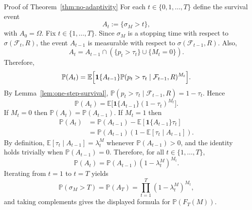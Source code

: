 \documentclass{uai2026} %
\newcommand{\1}{\mathbf{1}}
\newcommand{\ind}[1]{\mathbf{1}\{#1\}}
\newcommand{\prob}{\mathbb{P}}
\newcommand{\expec}{\mathbb{E}}
\newcommand{\F}{\mathcal{F}}
\begin{document}
\begin{appendixproof}{Proof of Theorem~\ref{thm:no-adaptivity}}
  For each $t\in\{0,1,\dots,T\}$ define the survival event
  \begin{equation*}
    A_{t}:=\{\sigma_{M}>t\},
  \end{equation*}
  with $A_{0}=\Omega$.
  Fix $t\in\{1,\dots,T\}$.
  Since $\sigma_{M}$ is a stopping time with respect to $\sigma(\F_{t},R)$, the event $A_{t-1}$ is measurable with respect to $\sigma(\F_{t-1},R)$.
  Also,
  \begin{equation*}
    A_{t}
    =
    A_{t-1}\cap\left(\{p_{t}>\tau_{t}\}\cup\{M_{t}=0\}\right).
  \end{equation*}
  Therefore,
  \begin{equation*}
    \prob(A_{t})
    =
    \expec\Bigl[\ind{A_{t-1}}\prob(p_{t}>\tau_{t}\mid \F_{t-1},R)^{M_{t}}\Bigr].
  \end{equation*}
  By Lemma~\ref{lem:one-step-survival}, $\prob(p_{t}>\tau_{t}\mid \F_{t-1},R)=1-\tau_{t}$.
  Hence
  \begin{equation*}
    \prob(A_{t})
    =
    \expec\bigl[\ind{A_{t-1}}(1-\tau_{t})^{M_{t}}\bigr].
  \end{equation*}
  If $M_{t}=0$ then $\prob(A_{t})=\prob(A_{t-1})$.
  If $M_{t}=1$ then
  \begin{equation*}
    \begin{aligned}
      \prob(A_{t})
      &= \prob(A_{t-1})-\expec[\ind{A_{t-1}}\tau_{t}]\\
      &= \prob(A_{t-1})\left(1-\expec[\tau_{t}\mid A_{t-1}]\right).
    \end{aligned}
  \end{equation*}
  By definition, $\expec[\tau_{t}\mid A_{t-1}]=\lambda_{t}^{M}$ whenever $\prob(A_{t-1})>0$, and the identity holds trivially when $\prob(A_{t-1})=0$.
  Therefore, for all $t\in\{1,\dots,T\}$,
  \begin{equation*}
    \prob(A_{t})=\prob(A_{t-1})(1-\lambda_{t}^{M})^{M_{t}}.
  \end{equation*}
  Iterating from $t=1$ to $t=T$ yields
  \begin{equation*}
    \prob(\sigma_{M}>T)=\prob(A_{T})=\prod_{t=1}^{T}(1-\lambda_{t}^{M})^{M_{t}},
  \end{equation*}
  and taking complements gives the displayed formula for $\prob(F_{T}(M))$.


\end{appendixproof}
\end{document}
